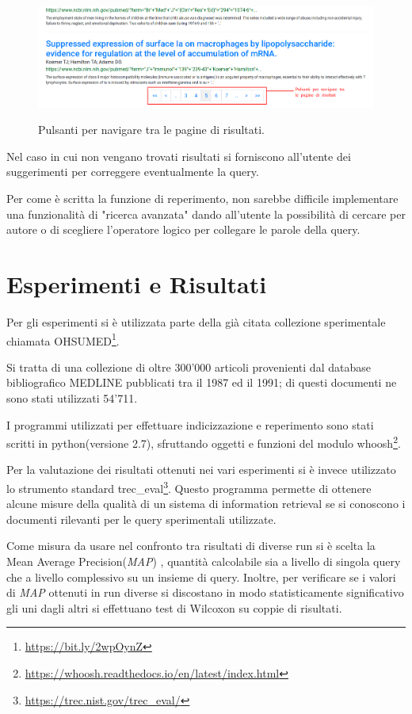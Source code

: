\documentclass[runningheads]{llncs}
\begin{document}
\begin{figure}%
    \centering
    {{\includegraphics[width=1\linewidth]{pagination} }}%
    \caption{Pulsanti per navigare tra le pagine di risultati.}%
\end{figure}

Nel caso in cui non vengano trovati risultati si forniscono all'utente dei
suggerimenti per correggere eventualmente la query.

Per come \`e scritta la funzione di reperimento, non sarebbe difficile
implementare una funzionalit\`a di "ricerca avanzata" dando all'utente la possibilit\`a 
di cercare per autore o di scegliere l'operatore logico per collegare le parole
della query.

\section{Esperimenti e Risultati}
\label{sec:esperimenti}


Per gli esperimenti si \`e utilizzata parte della gi\`a citata collezione sperimentale chiamata OHSUMED\footnote{ \url{https://bit.ly/2wpOynZ}}.

Si tratta di una collezione di oltre 300'000 articoli provenienti dal database bibliografico MEDLINE pubblicati tra il 1987 ed il 1991; di questi documenti ne sono stati utilizzati 54'711.

I programmi utilizzati per effettuare indicizzazione e reperimento sono stati scritti in python(versione 2.7), sfruttando oggetti e funzioni del modulo whoosh\footnote{ \url{https://whoosh.readthedocs.io/en/latest/index.html}}.

Per la valutazione dei risultati ottenuti nei vari esperimenti si \`e invece utilizzato lo strumento standard trec\_eval\footnote{ \url{https://trec.nist.gov/trec\_eval/}}.
Questo programma permette di ottenere alcune misure della qualit\`a di un sistema di information retrieval se si conoscono i documenti rilevanti per le query sperimentali utilizzate.

Come misura da usare nel confronto tra risultati di diverse run si \`e scelta la Mean Average Precision(\textit{MAP})\cite{WBC_map} , quantit\`a calcolabile sia a livello di singola query che a livello complessivo su un insieme di query.
Inoltre, per verificare se i valori di \textit{MAP} ottenuti in run diverse si discostano in modo statisticamente significativo gli uni dagli altri si effettuano test di Wilcoxon\cite{} su coppie di risultati. \par
\end{document}
